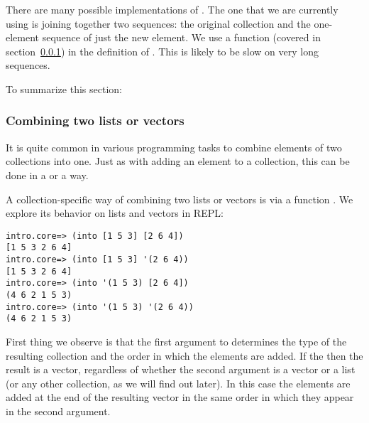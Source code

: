There are many possible implementations of . The one that we are currently using is joining together two sequences: the original collection and the one-element sequence of just the new element. We use a function  (covered in section~\ref{subsubsec:into-concat}) in the definition of . This is likely to be slow on very long sequences.

To summarize this section:

\subsubsection{Combining two lists or vectors}\label{subsubsec:into-concat}
It is quite common in various programming tasks to combine elements of two collections into one. Just as with adding an element to a collection, this can be done in a  or a  way. 

A collection-specific way of combining two lists or vectors is via a function . We explore its behavior on lists and vectors in REPL:
\begin{framed}
\begin{verbatim}
intro.core=> (into [1 5 3] [2 6 4])
[1 5 3 2 6 4]
intro.core=> (into [1 5 3] '(2 6 4))
[1 5 3 2 6 4]
intro.core=> (into '(1 5 3) [2 6 4])
(4 6 2 1 5 3)
intro.core=> (into '(1 5 3) '(2 6 4))
(4 6 2 1 5 3)
\end{verbatim}
\end{framed}
First thing we observe is that the first argument to  determines the type of the resulting collection and the order in which the elements are added. If the  then the result is a vector, regardless of whether the second argument is a vector or a list (or any other collection, as we will find out later). In this case the elements are added at the end of the resulting vector in the same order in which they appear in the second argument. 

